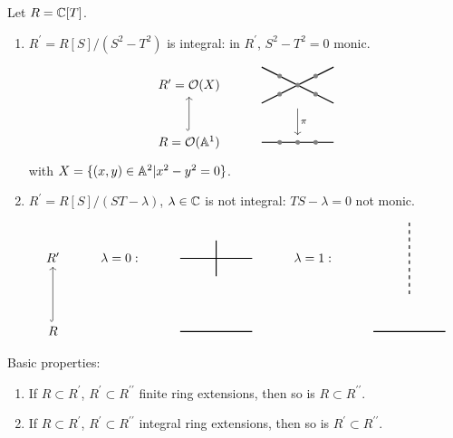 \documentclass[a4paper,11pt]{article}
\begin{document}
			\begin{eg}
				Let $R=\CC[T]$.
				\begin{enumerate}
					\item $R^\prime=R[S]/(S^2-T^2)$ is integral: in $R^\prime$, $S^2-T^2=0$ monic.
						\begin{equation*}
							\begin{tikzcd}
								R^\prime=\O(X) & \tikz[baseline=-.1cm]{\draw[thick](-1,.5)--(1,-.5);\draw[thick](-1,-.5)--(1,.5);\draw[thick,gray,fill](-.5,.25)circle[radius=.05cm];\draw[thick,gray,fill](-.5,-.25)circle[radius=.05cm];\draw[thick,gray,fill](0,0)circle[radius=.05cm];\draw[thick,gray,fill](.5,.25)circle[radius=.05cm];\draw[thick,gray,fill](.5,-.25)circle[radius=.05cm]}\ar[d,"\pi"]\\
								R=\O(\AA^1)\ar[u,hook] & \tikz[baseline=-.1cm]{\draw[thick](-1,0)--(1,0);\draw[thick,gray,fill](-.5,0)circle[radius=.05cm];\draw[thick,gray,fill](0,0)circle[radius=.05cm];\draw[thick,gray,fill](.5,0)circle[radius=.05cm]}
							\end{tikzcd}
						\end{equation*}
						with $X=\{(x,y)\in\AA^2|x^2-y^2=0\}$.
					\item $R^\prime=R[S]/(ST-\lambda)$, $\lambda\in\CC$ is not integral: $TS-\lambda=0$ not monic.
						\begin{equation*}
							\begin{tikzcd}
								R^\prime & \lambda=0: & \tikz[baseline=-.1cm]{\draw[thick](-1,0)--(1,0);\draw[thick](0,.5)--(0,-.5)} & \lambda=1: & \tikz[baseline=-.1cm]{\draw[thick,dashed](0,1)--(0,-1);\draw[thick]plot[smooth] file {plots/xy1.table};\draw[thick]plot[smooth] file {plots/xy2.table}}\\
								R\ar[u,hook] & & \tikz[baseline=-.1cm]{\draw[thick](-1,0)--(1,0)} & & \tikz[baseline=-.1cm]{\draw[thick](-1,0)--(1,0)}
							\end{tikzcd}
						\end{equation*}
				\end{enumerate}
			\end{eg}

			\noindent Basic properties:
			\begin{enumerate}
				\item If $R\subset R^\prime$, $R^\prime\subset R^{\prime\prime}$ finite ring extensions, then so is $R\subset R^{\prime\prime}$.
				\item If $R\subset R^\prime$, $R^\prime\subset R^{\prime\prime}$ integral ring extensions, then so is $R^\prime\subset R^{\prime\prime}$.
			\end{enumerate}
\end{document}
